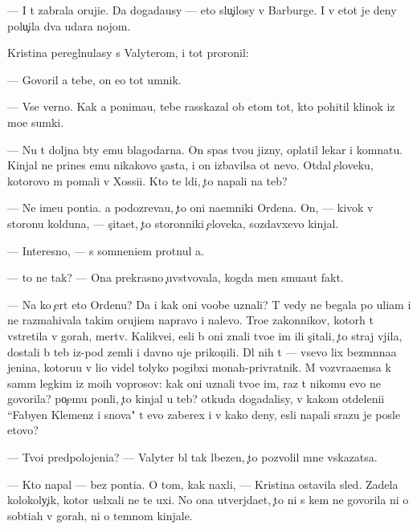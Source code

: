 \documentclass[10pt]{book}
\begin{document}
— I t{\yi} zabrala oruji{\y}e. Da{\y} dogada{\y}usy — eto slu{\c}ilosy v Barburge. I v etot je deny polu{\c}ila dva udara nojom.

Kristina peregl{\ia}nulasy s Valyterom, i tot proronil:

— Govoril {\y}a tebe, on {\y}e{\x}o tot umnik.

— Vse verno. Kak {\y}a ponima{\y}u, tebe rasskazal ob etom tot, kto pohitil klinok iz mo{\y}e{\y} sumki.

— Nu t{\yi} doljna b{\yi}ty {\y}emu blagodarna. On spas tvo{\y}u jizny, oplatil lekar{\ia} i komnatu. Kinjal ne prines {\y}emu nikakovo s{\c}ast{\y}a, i on izbavilsa ot nevo. Otdal {\c}eloveku, kotorovo m{\yi} po{\y}mali v Xossi{\y}i. Kto te l{\iu}di, {\c}to napali na teb{\ia}?

— Ne ime{\y}u pon{\ia}ti{\y}a. {\Y}a podozreva{\y}u, {\c}to oni na{\y}emniki Ordena. On, — kivok v storonu kolduna, — s{\c}ita{\y}et, {\c}to storonniki {\c}eloveka, sozdavxevo kinjal.

— Interesno, — s somneni{\y}em prot{\ia}nul {\y}a.

— {\C}to ne tak? — Ona prekrasno {\c}uvstvovala, kogda men{\ia} smu{\x}a{\y}ut fakt{\yi}.

— Na ko{\y} {\c}ert eto Ordenu? Da i kak oni voob{\x}e uznali? T{\yi} vedy ne begala po uli{\q}am i ne razmahivala takim oruji{\y}em napravo i nalevo. Tro{\y}e zakonnikov, kotor{\yi}h t{\yi} vstretila v gorah, mertv{\yi}. Kalikve{\q}i, {\y}esli b{\yi} oni znali tvo{\y}e im{\ia} ili s{\c}itali, {\c}to straj v{\yi}jila, dostali b{\yi} teb{\ia} iz-pod zemli i davno uje prikon{\c}ili. Dl{\ia} nih t{\yi} — vsevo lix bez{\yi}m{\ia}nna{\y}a jen{\x}ina, kotoru{\y}u v li{\q}o videl tolyko pogibxi{\y} monah-privratnik. M{\yi} vozvra{\x}a{\y}emsa k sam{\yi}m legkim iz mo{\y}ih voprosov: kak oni uznali tvo{\y}e im{\ia}, raz t{\yi} nikomu {\y}evo ne govorila? po{\c}emu pon{\ia}li, {\c}to kinjal u teb{\ia}? otkuda dogadalisy, v kakom otdeleni{\y}i ``Fabyen Klemenz i s{\yi}nov{\y}a" t{\yi} {\y}evo zaberex i v kako{\y} deny, {\y}esli napali srazu je posle etovo?

— Tvo{\y}i predpolojeni{\y}a? — Valyter b{\yi}l tak l{\iu}bezen, {\c}to pozvolil mne v{\yi}skazatsa.

— Kto napal — bez pon{\ia}ti{\y}a. O tom, kak naxli, — Kristina ostavila sled{\yi}. Zadela kolokoly{\c}ik, kotor{\yi}{\y} usl{\yi}xali ne te uxi. No ona utverjda{\y}et, {\c}to ni s kem ne govorila ni o sob{\yi}ti{\y}ah v gorah, ni o temnom kinjale.
\end{document}
